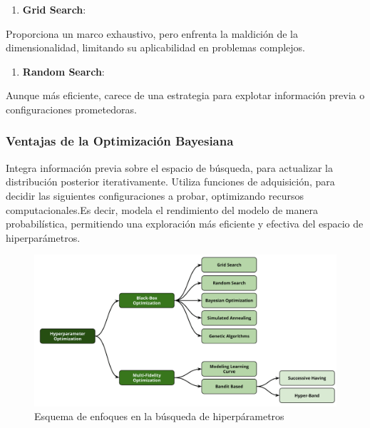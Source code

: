 \documentclass[
  12pt,
  letterpaper,
  DIV=11,
  numbers=noendperiod]{scrartcl}
\providecommand{\tightlist}{%
  \setlength{\itemsep}{0pt}\setlength{\parskip}{0pt}}\usepackage{longtable,booktabs,array}
\begin{document}
\begin{enumerate}
\def\labelenumi{\arabic{enumi}.}
\tightlist
\item
  \textbf{Grid Search}:
\end{enumerate}

Proporciona un marco exhaustivo, pero enfrenta la maldición de la
dimensionalidad, limitando su aplicabilidad en problemas complejos.

\begin{enumerate}
\def\labelenumi{\arabic{enumi}.}
\setcounter{enumi}{1}
\tightlist
\item
  \textbf{Random Search}:
\end{enumerate}

Aunque más eficiente, carece de una estrategia para explotar información
previa o configuraciones prometedoras.

\subsubsection{Ventajas de la Optimización
Bayesiana}\label{ventajas-de-la-optimizaciuxf3n-bayesiana}

Integra información previa sobre el espacio de búsqueda, para actualizar
la distribución posterior iterativamente. Utiliza funciones de
adquisición, para decidir las siguientes configuraciones a probar,
optimizando recursos computacionales.Es decir, modela el rendimiento del
modelo de manera probabilística, permitiendo una exploración más
eficiente y efectiva del espacio de hiperparámetros.

\begin{figure}[H]

{\centering \includegraphics{imgs/esquema_enfoques_HPO.png}

}

\caption{Esquema de enfoques en la búsqueda de hiperpárametros}

\end{figure}%
\end{document}
